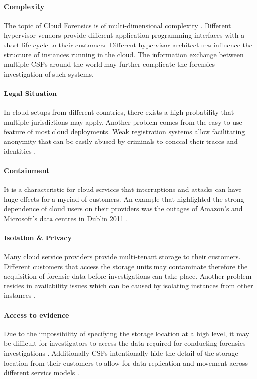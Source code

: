 \documentclass[runningheads,a4paper]{llncs}
\begin{document}
\paragraph{Complexity} The topic of Cloud Forensics is of multi-dimensional complexity \cite{Ruan2011}. Different hypervisor vendors provide different application programming interfaces with a short life-cycle to their customers. Different hypervisor architectures influence the structure of instances running in the cloud. The information exchange between multiple CSPs around the world may further complicate the forensics investigation of such systems. 

\paragraph{Legal Situation} In cloud setups from different countries, there exists a high probability that multiple jurisdictions may apply. Another problem comes from the easy-to-use feature of most cloud deployments. Weak registration systems allow facilitating anonymity that can be easily abused by criminals to conceal their traces and identities \cite{Taylor2012}.

\paragraph{Containment} It is a characteristic for cloud services that interruptions and attacks can have huge effects for a myriad of customers. An example that highlighted the strong dependence of cloud users on their providers was the outages of Amazon's and Microsoft's data centres in Dublin 2011 \cite{Miller2011}. 

\paragraph{Isolation \& Privacy} Many cloud service providers provide multi-tenant storage to their customers. Different customers that access the storage units may contaminate therefore the acquisition of forensic data before investigations can take place. Another problem resides in availability issues which can be caused by isolating instances from other instances \cite{Grispos2011}. 

\paragraph{Access to evidence} Due to the impossibility of specifying the storage location at a high level, it may be difficult for investigators to access the data required for conducting forensics investigations \cite{Reilly2010}. Additionally CSPs intentionally hide the detail of the storage location from their customers to allow for data replication and movement across different service models \cite{Grispos2011}. 
\end{document}
